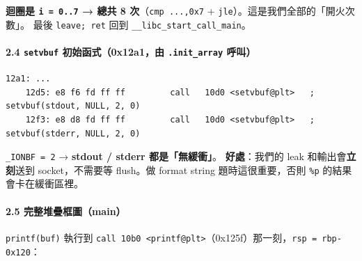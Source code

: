 \documentclass[10pt,a4paper]{article}
\begin{document}
\textbf{迴圈是 \texttt{i\ \allowbreak{}=\ \allowbreak{}0..\allowbreak{}7} → 總共 8 次}（\texttt{cmp\ \allowbreak{}...,\allowbreak{}0x7} +
\texttt{jle}）。這是我們全部的「開火次數」。 最後 \texttt{leave;\ \allowbreak{}ret}
回到 \texttt{\_\allowbreak{}\_\allowbreak{}libc\_\allowbreak{}start\_\allowbreak{}call\_\allowbreak{}main}。

\paragraph{\texorpdfstring{2.4 \texttt{setvbuf} 初始函式（0x12a1，由
\texttt{.\allowbreak{}init\_\allowbreak{}array}
呼叫）}{2.4 setvbuf 初始函式（0x12a1，由 .init\_array 呼叫）}}\label{setvbuf-ux521dux59cbux51fdux5f0f0x12a1ux7531-.init_array-ux547cux53eb}

\begin{Verbatim}[breaklines=true,breakanywhere=true,breakautoindent=false,fontsize=\fontsize{7.0}{9.5}\selectfont]
    12a1: ... 
    12d5: e8 f6 fd ff ff         call   10d0 <setvbuf@plt>   ; setvbuf(stdout, NULL, 2, 0)
    12f3: e8 d8 fd ff ff         call   10d0 <setvbuf@plt>   ; setvbuf(stderr, NULL, 2, 0)
\end{Verbatim}

\texttt{\_\allowbreak{}IONBF\ \allowbreak{}=\ \allowbreak{}2} → \textbf{stdout / stderr 都是「無緩衝」}。
\textbf{好處}：我們的 leak 和輸出會\textbf{立刻}送到 socket，不需要等
flush。做 format string 題時這很重要，否則 \texttt{\%\allowbreak{}p}
的結果會卡在緩衝區裡。

\paragraph{2.5
完整堆疊框圖（main）}\label{ux5b8cux6574ux5806ux758aux6846ux5716main}

\texttt{printf(buf)} 執行到
\texttt{call\ \allowbreak{}10b0\ \allowbreak{}\textless{}\allowbreak{}printf@plt\textgreater{}\allowbreak{}}（0x125f）那一刻，\texttt{rsp\ \allowbreak{}=\ \allowbreak{}rbp-\allowbreak{}0x120}：
\end{document}
